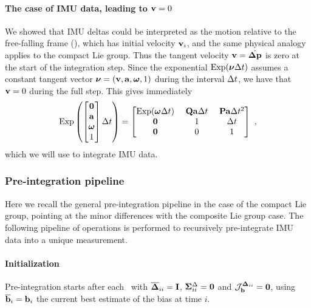 \paragraph{The case of IMU data, leading to \texorpdfstring{${\bf v}=0$}{bfv=0}}
\label{sec:IMU_case}

We showed that IMU deltas could be interpreted as the motion relative to the free-falling frame (), which has initial velocity ${\bf v}_i$, and the same physical analogy applies to the compact Lie group.
Thus the tangent velocity ${\bf v}=\dot{{\bm \Delta {\bf p}}}$  is zero at the start of the integration step. 
%
Since the exponential $\operatorname*{Exp}(\bm\nu\Delta t)$ assumes a constant tangent vector $\bm\nu=({\bf v},{\bf a},{{\bm \omega}},1)$ during the interval $\Delta t$, we have that ${\bf v}=0$ during the full step. 
%
This gives immediately
%
\begin{equation}
    \operatorname*{Exp}\left(\begin{bmatrix}
    \bf0 \\ {\bf a} \\ {{\bm \omega}} \\ 1
    \end{bmatrix}\Delta t\right) 
    = \begin{bmatrix}
    \operatorname*{Exp}({{\bm \omega}}\Delta t) & ~{\bf Q}{\bf a}\Delta t~ & {\bf P}{\bf a}\Delta t^2 \\
    \bf0 & 1 & \Delta t \\
    \bf0 & 0 & 1
    \end{bmatrix}
    ~,
    \label{eq:exp_compact_imu}
\end{equation}
%
which we will use to integrate IMU data.






%
%
%
\subsubsection{Pre-integration pipeline}
\label{sec:pre-integration-pipeline}

Here we recall the general pre-integration pipeline in the case of the compact Lie group, pointing at the minor differences with the composite Lie group case.
The following pipeline of operations is performed to recursively pre-integrate IMU data into a unique measurement.

\paragraph{Initialization}
Pre-integration starts after each \keyframe\ with $\overline{{{\bm \Delta}}}_{ii} = {\bf I}$, ${\bm \Sigma}^\Delta_{ii} = \bf0$ and ${\mathcal{J}^{{{\bm \Delta}}_{ii}}_{{\bf b}}} = \bf0$, using $\overline{{\bf b}}_i = {\bf b}_i$ the current best estimate of the bias at time $i$.

